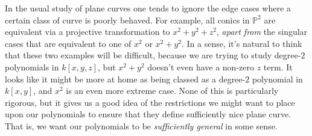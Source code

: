 \documentclass[10pt,notitlepage]{article}
\numberwithin{equation}{subsection}
\newcommand{\pee}{\mathbb{P}}
\begin{document}
            In the usual study of plane curves one tends to ignore the edge cases where a certain class of curve is poorly behaved.
            For example, all conics in $\pee^2$ are equivalent via a projective transformation to $x^2+y^2+z^2$, \emph{apart from} the singular cases that are equivalent to one of $x^2$ or $x^2+y^2$.
            In a sense, it's natural to think that these two examples will be difficult, because we are trying to study degree-$2$ polynomials in $k[x,y,z]$, but $x^2+y^2$ doesn't even have a non-zero $z$ term.
            It looks like it might be more at home as being classed as a degree-$2$ polynomial in $k[x,y]$, and $x^2$ is an even more extreme case.
            None of this is particularly rigorous, but it gives us a good idea of the restrictions we might want to place upon our polynomials to ensure that they define sufficiently nice plane curve.
            That is, we want our polynomials to be \emph{sufficiently general} in some sense.
\end{document}
